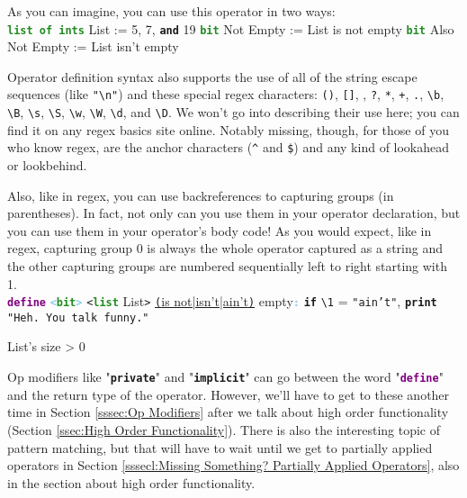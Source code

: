 \documentclass{article}
\newcommand{\type}[1]{\texttt{\textcolor{ForestGreen}{\textbf{#1}}}}
\newcommand{\keyop}[1]{\texttt{\textcolor{Purple}{\textbf{#1}}}}
\newcommand{\common}[1]{\texttt{\textcolor{Mulberry}{\textbf{#1}}}}
\newcommand{\defpunct}[1]{\texttt{\textcolor{SkyBlue}{\textbf{#1}}}}
\newcommand{\codespecial}[1]{\texttt{\textcolor{CarnationPink}{#1}}}
\newcommand{\codestring}[1]{\texttt{\textcolor{NavyBlue}{"#1"}}}
\newenvironment{code}[0]
{\ttfamily{}				%
\setlength\parindent{0cm}	%
~\\}
{\setlength\parindent{1cm}
~\\}
\begin{document}
\indent As you can imagine, you can use this operator in two ways:
\begin{code}
\type{list of ints} List := 5, 7, \common{and} 19
\type{bit} Not Empty := List is not empty
\type{bit} Also Not Empty := List isn't empty
\end{code}

\indent Operator definition syntax also supports the use of all of the string escape sequences (like \codestring{\textbackslash{}n}) and these special regex characters: \codespecial{()}, \codespecial{[]}, \codespecial{{}}, \codespecial{?}, \codespecial{*}, \codespecial{+}, \codespecial{.}, \codespecial{\textbackslash{}b}, \codespecial{\textbackslash{}B}, \codespecial{\textbackslash{}s}, \codespecial{\textbackslash{}S}, \codespecial{\textbackslash{}w}, \codespecial{\textbackslash{}W}, \codespecial{\textbackslash{}d}, and \codespecial{\textbackslash{}D}. We won't go into describing their use here; you can find it on any regex basics site online. Notably missing, though, for those of you who know regex, are the anchor characters (\codespecial{\textasciicircum} and \codespecial{\$}) and any kind of lookahead or lookbehind.

\indent Also, like in regex, you can use backreferences to capturing groups (in parentheses). In fact, not only can you use them in your operator declaration, but you can use them in your operator's body code! As you would expect, like in regex, capturing group 0 is always the whole operator captured as a string and the other capturing groups are numbered sequentially left to right starting with 1.
\begin{code}
\keyop{define} \defpunct{<}\type{bit}\defpunct{>} \codespecial{<}\type{list} List\codespecial{>} \underline{\codespecial{(}is not|isn't|ain't\codespecial{)}} empty\defpunct{:}
\qquad{}\common{if} \codespecial{\textbackslash{}1} = \codestring{ain't},
\qquad{}\qquad{}\common{print} \codestring{Heh. You talk funny.}

\qquad{}List's size > 0
\end{code}

\indent Op modifiers like "\common{private}" and "\common{implicit}" can go between the word "\keyop{define}" and the return type of the operator. However, we'll have to get to these another time in Section \ref{sssec:Op Modifiers} after we talk about high order functionality (Section \ref{ssec:High Order Functionality}).
\indent There is also the interesting topic of pattern matching, but that will have to wait until we get to partially applied operators in Section \ref{sssecl:Missing Something? Partially Applied Operators}, also in the section about high order functionality.
\end{document}
